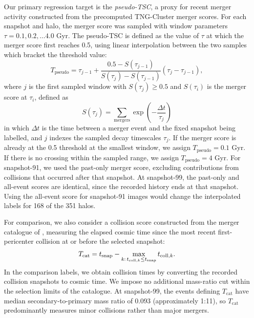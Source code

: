 Our primary regression target is the \emph{pseudo-TSC}, a proxy for recent merger activity constructed from the precomputed TNG-Cluster merger scores.
For each snapshot and halo, the merger score was sampled with window parameters $\tau = 0.1, 0.2, \ldots 4.0$ Gyr.
The pseudo-TSC is defined as the value of $\tau$ at which the merger score first reaches 0.5, using linear interpolation between the two samples which bracket the threshold value:
\begin{equation}
    T_\text{pseudo}
    = \tau_{j-1} + 
     \frac{0.5-S(\tau_{j-1})}
       {S(\tau_j)-S(\tau_{j-1})}
  (\tau_j-\tau_{j-1}),
\end{equation}
where $j$ is the first sampled window with $S(\tau_j) \geq 0.5$ and $S(\tau_i)$ is the merger score at $\tau_i$, defined as \citep{KongDellAntonio2026}
\begin{equation}
    S(\tau_j)
    = \sum_\text{mergers} \exp \left(-\frac{\Delta t}{\tau_j} \right)
\end{equation}
in which $\Delta t$ is the time between a merger event and the fixed snapshot being labelled, and $j$ indexes the sampled decay timescales $\tau_j$.
If the merger score is already at the 0.5 threshold at the smallest window, we assign $T_\text{pseudo} = 0.1$ Gyr.
If there is no crossing within the sampled range, we assign $T_\text{pseudo} = 4$ Gyr.
For snapshot-91, we used the past-only merger score, excluding contributions from collisions that occurred after that snapshot.
At snapshot-99, the past-only and all-event scores are identical, since the recorded history ends at that snapshot.
Using the all-event score for snapshot-91 images would change the interpolated labels for 168 of the 351 halos.

For comparison, we also consider a collision score constructed from the merger catalogue of \citet{Lee2024}, measuring the elapsed cosmic time since the most recent first-pericenter collision at or before the selected snapshot:
\begin{equation}
  T_{\rm cat} =
  t_{\rm snap}
  - \max_{k:\,t_{{\rm coll},k}\leq t_{\rm snap}}
  t_{{\rm coll},k}.
\end{equation}
In the comparison labels, we obtain collision times by converting the recorded collision snapshots to cosmic time.
We impose no additional mass-ratio cut within the selection limits of the catalogue.
At snapshot-99, the events defining $T_\text{cat}$ have median secondary-to-primary mass ratio of 0.093 (approximately 1:11), so $T_\text{cat}$ predominantly measures minor collisions rather than major mergers.

